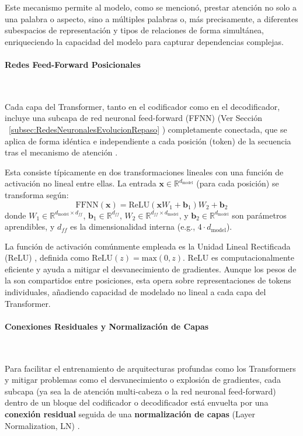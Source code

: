 Este mecanismo permite al modelo, como se mencionó, prestar atención no solo a una palabra o aspecto, sino a múltiples palabras o, más precisamente, a diferentes subespacios de representación y tipos de relaciones de forma simultánea, enriqueciendo la capacidad del modelo para capturar dependencias complejas.

\paragraph{Redes Feed-Forward Posicionales} \ 

Cada capa del Transformer, tanto en el codificador como en el decodificador, incluye una subcapa de red neuronal feed-forward (FFNN) (Ver Sección ~\ref{subsec:RedesNeuronalesEvolucionRepaso} ) completamente conectada, que se aplica de forma idéntica e independiente a cada posición (token) de la secuencia tras el mecanismo de atención \citep{Vaswani2017}.

Esta  consiste típicamente en dos transformaciones lineales con una función de activación no lineal entre ellas. La entrada $\mathbf{x} \in \mathbb{R}^{d_{\text{model}}}$ (para cada posición) se transforma según:
\begin{equation}
\text{FFNN}(\mathbf{x}) = \text{ReLU}(\mathbf{x}W_1 + \mathbf{b}_1)W_2 + \mathbf{b}_2
\label{eq:ffn_transformer_sintetizado}
\end{equation}
donde $W_1 \in \mathbb{R}^{d_{\text{model}} \times d_{ff}}$, $\mathbf{b}_1 \in \mathbb{R}^{d_{ff}}$, $W_2 \in \mathbb{R}^{d_{ff} \times d_{\text{model}}}$, y $\mathbf{b}_2 \in \mathbb{R}^{d_{\text{model}}}$ son parámetros aprendibles, y $d_{ff}$ es la dimensionalidad interna (e.g., $4 \cdot d_{\text{model}}$).

La función de activación comúnmente empleada es la Unidad Lineal Rectificada (ReLU) \citep{Nair2010relu, Glorot2011deep}, definida como $\text{ReLU}(z) = \text{max}(0, z)$. ReLU es computacionalmente eficiente y ayuda a mitigar el desvanecimiento de gradientes. Aunque los pesos de la  son compartidos entre posiciones, esta opera sobre representaciones de tokens individuales, añadiendo capacidad de modelado no lineal a cada capa del Transformer.

\paragraph{Conexiones Residuales y Normalización de Capas} \

Para facilitar el entrenamiento de arquitecturas profundas como los Transformers y mitigar problemas como el desvanecimiento o explosión de gradientes, cada subcapa (ya sea la de atención multi-cabeza o la red neuronal feed-forward) dentro de un bloque del codificador o decodificador está envuelta por una \textbf{conexión residual} \citep{He2016deepresidual} seguida de una \textbf{normalización de capas} (Layer Normalization, LN) \citep{Ba2016layer}.

